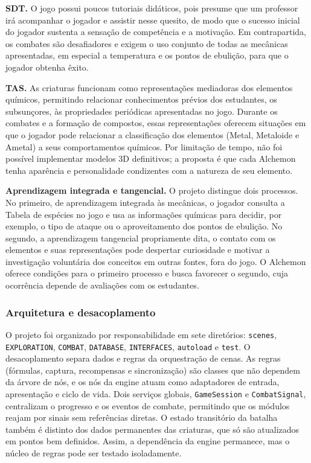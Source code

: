 \textbf{SDT.} O jogo possui poucos tutoriais didáticos, pois presume que um professor irá acompanhar o jogador e assistir nesse quesito, de modo que o sucesso inicial do jogador sustenta a sensação de competência e a motivação. Em contrapartida, os combates são desafiadores e exigem o uso conjunto de todas as mecânicas apresentadas, em especial a temperatura e os pontos de ebulição, para que o jogador obtenha êxito.

\textbf{TAS.} As criaturas funcionam como representações mediadoras dos elementos químicos, permitindo relacionar conhecimentos prévios dos estudantes, os subsunçores, às propriedades periódicas apresentadas no jogo. Durante os combates e a formação de compostos, essas representações oferecem situações em que o jogador pode relacionar a classificação dos elementos (Metal, Metaloide e Ametal) a seus comportamentos químicos. Por limitação de tempo, não foi possível implementar modelos 3D definitivos; a proposta é que cada Alchemon tenha aparência e personalidade condizentes com a natureza de seu elemento.

\textbf{Aprendizagem integrada e tangencial.} O projeto distingue dois processos. No primeiro, de aprendizagem integrada às mecânicas, o jogador consulta a Tabela de espécies no jogo e usa as informações químicas para decidir, por exemplo, o tipo de ataque ou o aproveitamento dos pontos de ebulição. No segundo, a aprendizagem tangencial propriamente dita, o contato com os elementos e suas representações pode despertar curiosidade e motivar a investigação voluntária dos conceitos em outras fontes, fora do jogo. O Alchemon oferece condições para o primeiro processo e busca favorecer o segundo, cuja ocorrência depende de avaliações com os estudantes.

\subsubsection{Arquitetura e desacoplamento}
O projeto foi organizado por responsabilidade em sete diretórios: \texttt{scenes}, \texttt{EXPLORATION}, \texttt{COMBAT}, \texttt{DATABASE}, \texttt{INTERFACES}, \texttt{autoload} e \texttt{test}. O desacoplamento separa dados e regras da orquestração de cenas. As regras (fórmulas, captura, recompensas e sincronização) são classes que não dependem da árvore de nós, e os nós da engine atuam como adaptadores de entrada, apresentação e ciclo de vida. Dois serviços globais, \texttt{GameSession} e \texttt{CombatSignal}, centralizam o progresso e os eventos de combate, permitindo que os módulos reajam por sinais sem referências diretas. O estado transitório da batalha também é distinto dos dados permanentes das criaturas, que só são atualizados em pontos bem definidos. Assim, a dependência da engine permanece, mas o núcleo de regras pode ser testado isoladamente.

